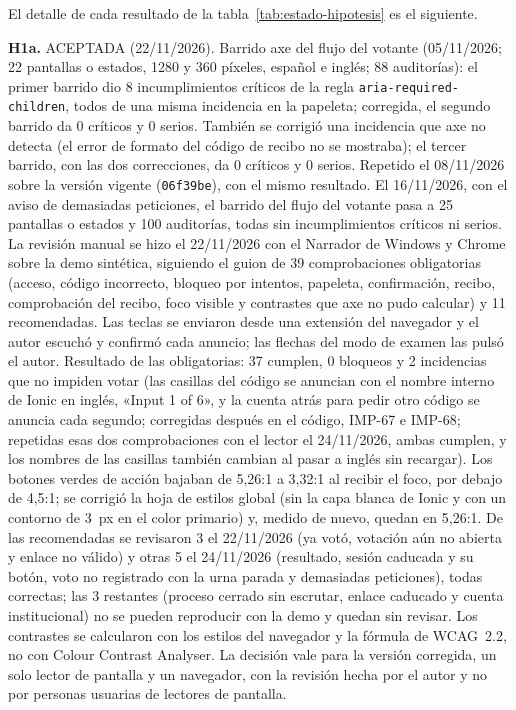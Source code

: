 El detalle de cada resultado de la tabla~\ref{tab:estado-hipotesis} es el siguiente.

\textbf{H1a.} ACEPTADA (22/11/2026). Barrido axe del flujo del votante (05/11/2026; 22 pantallas o estados, 1280 y 360 píxeles, español e inglés; 88 auditorías): el primer barrido dio 8 incumplimientos críticos de la regla \texttt{aria-required-children}, todos de una misma incidencia en la papeleta; corregida, el segundo barrido da 0 críticos y 0 serios. También se corrigió una incidencia que axe no detecta (el error de formato del código de recibo no se mostraba); el tercer barrido, con las dos correcciones, da 0 críticos y 0 serios. Repetido el 08/11/2026 sobre la versión vigente (\texttt{06f39be}), con el mismo resultado. El 16/11/2026, con el aviso de demasiadas peticiones, el barrido del flujo del votante pasa a 25 pantallas o estados y 100 auditorías, todas sin incumplimientos críticos ni serios. La revisión manual se hizo el 22/11/2026 con el Narrador de Windows y Chrome sobre la demo sintética, siguiendo el guion de 39 comprobaciones obligatorias (acceso, código incorrecto, bloqueo por intentos, papeleta, confirmación, recibo, comprobación del recibo, foco visible y contrastes que axe no pudo calcular) y 11 recomendadas. Las teclas se enviaron desde una extensión del navegador y el autor escuchó y confirmó cada anuncio; las flechas del modo de examen las pulsó el autor. Resultado de las obligatorias: 37 cumplen, 0 bloqueos y 2 incidencias que no impiden votar (las casillas del código se anuncian con el nombre interno de Ionic en inglés, «Input 1 of 6», y la cuenta atrás para pedir otro código se anuncia cada segundo; corregidas después en el código, IMP-67 e IMP-68; repetidas esas dos comprobaciones con el lector el 24/11/2026, ambas cumplen, y los nombres de las casillas también cambian al pasar a inglés sin recargar). Los botones verdes de acción bajaban de 5,26:1 a 3,32:1 al recibir el foco, por debajo de 4,5:1; se corrigió la hoja de estilos global (sin la capa blanca de Ionic y con un contorno de 3~px en el color primario) y, medido de nuevo, quedan en 5,26:1. De las recomendadas se revisaron 3 el 22/11/2026 (ya votó, votación aún no abierta y enlace no válido) y otras 5 el 24/11/2026 (resultado, sesión caducada y su botón, voto no registrado con la urna parada y demasiadas peticiones), todas correctas; las 3 restantes (proceso cerrado sin escrutar, enlace caducado y cuenta institucional) no se pueden reproducir con la demo y quedan sin revisar. Los contrastes se calcularon con los estilos del navegador y la fórmula de WCAG~2.2, no con Colour Contrast Analyser. La decisión vale para la versión corregida, un solo lector de pantalla y un navegador, con la revisión hecha por el autor y no por personas usuarias de lectores de pantalla.

